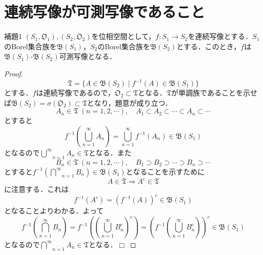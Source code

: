 \documentclass[a4paper,11pt]{jsarticle}
\newtheorem{proof}{証明}
\def\qed{\hfill $\Box$}
\begin{document}
\section{連続写像が可測写像であること}
\begin{itembox}[l]{補題1}
$(S_1,\mathfrak{O}_1),(S_2,\mathfrak{O}_2)$を位相空間として，$f:S_1\to S_2$を連続写像とする．$S_1$のBorel集合族を$\mathfrak{B}(S_1)$，$S_2$のBorel集合族を$\mathfrak{B}(S_2)$とする．このとき，$f$は$\mathfrak{B}(S_1)$-$\mathfrak{B}(S_2)$可測写像となる．
\end{itembox}
\vspace{-0.7zh}%
\vspace{-0.7zh}%
\begin{proof}
\begin{equation*}
\mathfrak{T}=\{A\in\mathfrak{B}(S_2) \mid f^{-1}(A)\in\mathfrak{B}(S_1)\}
\end{equation*}
とする．$f$は連続写像であるので，$\mathfrak{O}_2\subset\mathfrak{T}$となる．$\mathfrak{T}$が単調族であることを示せば$\mathfrak{B}(S_2)=\sigma(\mathfrak{O}_2)\subset\mathfrak{T}$となり，題意が成り立つ．
\begin{equation*}
A_n\in\mathfrak{T}{\ }(n=1,2,\cdots),\quad A_1\subset A_2\subset\cdots\subset A_n\subset\cdots
\end{equation*}
とすると
\begin{equation*}
f^{-1}\left(\bigcup_{n=1}^\infty A_n\right)=\bigcup_{n=1}^\infty f^{-1}(A_n)\in\mathfrak{B}(S_1)
\end{equation*}
となるので$\underset{n=1}{\overset{\infty}{\bigcup}}A_n\in\mathfrak{T}$となる．また
\begin{equation*}
B_n\in\mathfrak{T}{\ }(n=1,2,\cdots),\quad B_1\supset B_2\supset\cdots\supset B_n\supset\cdots
\end{equation*}
とすると$f^{-1}\left(\underset{n=1}{\overset{\infty}{\bigcap}} B_n\right)\in\mathfrak{B}(S_1)$となることを示すために
\begin{equation*}
A\in\mathfrak{T} \Longrightarrow A^c\in\mathfrak{T}
\end{equation*}
に注意する．これは
\begin{equation*}
f^{-1}(A^c)=(f^{-1}(A))^c\in\mathfrak{B}(S_1)
\end{equation*}
となることよりわかる．よって
\begin{equation*}
f^{-1}\left(\underset{n=1}{\overset{\infty}{\bigcap}} B_n\right)=f^{-1}\left(\left(\underset{n=1}{\overset{\infty}{\bigcup}} B_n^c\right)^c\right)=\left(f^{-1}\left(\underset{n=1}{\overset{\infty}{\bigcup}} B_n^c\right)\right)^c\in\mathfrak{B}(S_1)
\end{equation*}
となるので$\underset{n=1}{\overset{\infty}{\bigcap}}A_n\in\mathfrak{T}$となる．\qed
\end{proof}
%
%
%
%
\end{document}
